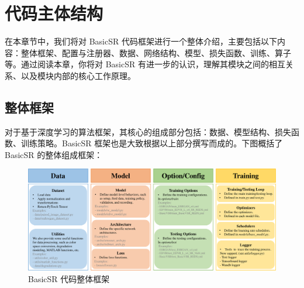 \documentclass[../main.tex]{subfiles}
\begin{document}
	
	\chapter{代码主体结构}
	\vspace{-2cm}
	
	在本章节中，我们将对 BasicSR 代码框架进行一个整体介绍，主要包括以下内容：整体框架、配置与注册器、数据、网络结构、模型、损失函数、训练、算子等。通过阅读本章，你将对 BasicSR 有进一步的认识，理解其模块之间的相互关系、以及模块内部的核心工作原理。
	
	
	\section{整体框架}
	对于基于深度学习的算法框架，其核心的组成部分包括：数据、模型结构、损失函数、训练策略。BasicSR 框架也是大致根据以上部分撰写而成的。下图概括了 BasicSR 的整体组成框架：
	
	\begin{figure}[htbp]
		\begin{center}
			\includegraphics[width=1\linewidth]{figures/main_framework.pdf}
		\end{center}
		\caption{BasicSR 代码整体框架}
		\label{fig:main_framework}
		
	\end{figure}
	
	
	
\end{document}
